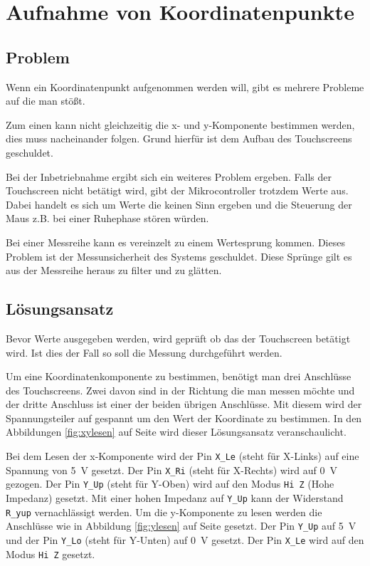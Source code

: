 \chapter{Aufnahme von Koordinatenpunkte}
\section{Problem}
Wenn ein Koordinatenpunkt aufgenommen werden will, gibt es mehrere Probleme auf die man stößt. 

Zum einen kann nicht gleichzeitig die x- und y-Komponente bestimmen werden, dies muss nacheinander folgen. 
Grund hierfür ist dem Aufbau des Touchscreens geschuldet.

Bei der Inbetriebnahme ergibt sich ein weiteres Problem ergeben. Falls der Touchscreen nicht betätigt wird, gibt der Mikrocontroller trotzdem Werte aus. 
Dabei handelt es sich um Werte die keinen Sinn ergeben und die Steuerung der Maus z.B. bei einer Ruhephase stören würden.

Bei einer Messreihe kann es vereinzelt zu einem Wertesprung kommen. 
Dieses Problem ist der Messunsicherheit des Systems geschuldet. Diese Sprünge gilt es aus der Messreihe heraus zu filter und zu glätten.

\section{Lösungsansatz}
Bevor Werte ausgegeben werden, wird geprüft ob das der Touchscreen betätigt wird. Ist dies der Fall so soll die Messung durchgeführt werden.

Um eine Koordinatenkomponente zu bestimmen, benötigt man drei Anschlüsse des Touchscreens. Zwei davon sind in der Richtung die man messen möchte und der dritte Anschluss ist einer der beiden übrigen Anschlüsse. 
Mit diesem wird der Spannungsteiler auf gespannt um den Wert der Koordinate zu bestimmen.
In den Abbildungen \ref{fig:xylesen} auf Seite \pageref{fig:xylesen} wird dieser Lösungsansatz veranschaulicht. 

Bei dem Lesen der x-Komponente  wird der Pin \verb$X_Le$ (steht für X-Links) auf eine Spannung von \SI{5}{V} gesetzt. Der Pin \verb$X_Ri$ (steht für X-Rechts) wird auf \SI{0}{V} gezogen.
Der Pin  \verb$Y_Up$ (steht für Y-Oben) wird auf den Modus \verb$Hi Z$ (Hohe Impedanz) gesetzt. Mit einer hohen Impedanz auf  \verb$Y_Up$ kann der Widerstand \verb$R_yup$ vernachlässigt werden. 
Um die y-Komponente zu lesen werden die Anschlüsse wie in Abbildung \ref{fig:ylesen} auf Seite \pageref{fig:ylesen} gesetzt. Der Pin \verb$Y_Up$ auf \SI{5}{V} und der Pin \verb$Y_Lo$ (steht für Y-Unten) auf \SI{0}{V} gesetzt. 
Der Pin \verb$X_Le$ wird auf den Modus \verb$Hi Z$ gesetzt. 

